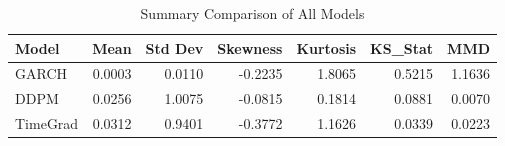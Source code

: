 \begin{table}
\caption{Summary Comparison of All Models}
\label{tab:summary_comparison}
\begin{tabular}{lrrrrrr}
\toprule
Model & Mean & Std Dev & Skewness & Kurtosis & KS_Stat & MMD \\
\midrule
GARCH & 0.0003 & 0.0110 & -0.2235 & 1.8065 & 0.5215 & 1.1636 \\
DDPM & 0.0256 & 1.0075 & -0.0815 & 0.1814 & 0.0881 & 0.0070 \\
TimeGrad & 0.0312 & 0.9401 & -0.3772 & 1.1626 & 0.0339 & 0.0223 \\
\bottomrule
\end{tabular}
\end{table}

